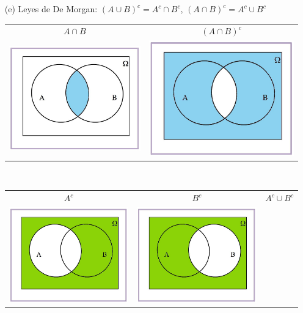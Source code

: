 \documentclass[handout]{beamer}\usepackage[]{graphicx}\usepackage[]{color}
\renewcommand{\emph}[1]{{\color{red}#1}}
\theoremstyle{plain}
\theoremstyle{definition}
\begin{document}
\begin{frame}
\begin{enumerate}
\begin{center}
\end{center}
\end{enumerate}
\end{frame}

\begin{frame}

\begin{enumerate}
\item[(e)] \emph{Leyes de De Morgan:} $(A\cup B)^c=A^c\cap B^c$, $(A\cap B)^c=A^c\cup B^c$
\medskip

\begin{center}
\begin{tabular}{cc}
\hspace*{-1cm}  $A\cap B$ & $(A\cap B)^c$ \\
\hspace*{-1cm} \includegraphics[width=0.3\linewidth]{demorgan1.jpg} &
\includegraphics[width=0.3\linewidth]{demorgan2.jpg} \end{tabular}\\[2ex]
\begin{tabular}{ccc}
\hspace*{-1cm}  $A^c$ & $B^c$ & $A^c\cup B^c$\\
\hspace*{-1cm} \includegraphics[width=0.3\linewidth]{demorgan3.jpg} &
\includegraphics[width=0.3\linewidth]{demorgan5.jpg} & 

\end{tabular}
\end{center}
\end{enumerate}
\end{frame}
\end{document}
